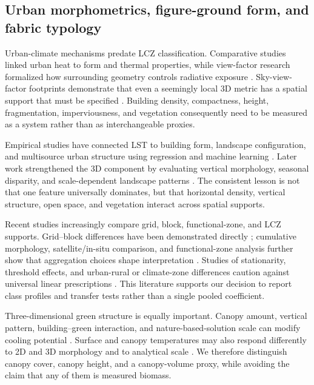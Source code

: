 \subsection{Urban morphometrics, figure-ground form, and fabric typology}

Urban-climate mechanisms predate LCZ classification. Comparative studies linked
urban heat to form and thermal properties, while view-factor research formalized
how surrounding geometry controls radiative exposure \citep{emmanuel2007UrbanHeat,
chen2010ViewFactor}. Sky-view-factor footprints demonstrate that even a
seemingly local 3D metric has a spatial support that must be specified
\citep{middel2018ViewFactor}. Building density, compactness, height,
fragmentation, imperviousness, and vegetation consequently need to be measured
as a system rather than as interchangeable proxies.

Empirical studies have connected LST to building form, landscape configuration,
and multisource urban structure using regression and machine learning
\citep{ferreira2019ExplorinRelation,huang2019InvestigEffects,
sun2019QuantifyEffects,zhang2019EvaluatiEffect}. Later work strengthened the
3D component by evaluating vertical morphology, seasonal disparity, and
scale-dependent landscape patterns \citep{alexander2021InfluencProporti,
yang2021AssessinEffects,chen2022SeasonalDisparat,
han2022UnderstaSeasonal,wu2022QuantifyInfluenc,wu2022ScaleEffect}. The
consistent lesson is not that one feature universally dominates, but that
horizontal density, vertical structure, open space, and vegetation interact
across spatial supports.

Recent studies increasingly compare grid, block, functional-zone, and LCZ
supports. Grid--block differences have been demonstrated directly
\citep{jeon2023ImpactsUrban}; cumulative morphology, satellite/in-situ
comparison, and functional-zone analysis further show that aggregation choices
shape interpretation \citep{park2023QuantifyCumulati,puche2023InsightsInto,
du2024DoesUrban,lin2024DoesUrban}. Studies of stationarity, threshold effects, and urban-rural
or climate-zone differences caution against universal linear prescriptions
\citep{yuan2024EffectsUrban,zhao2024MechanisStationa,
chen2025ImpactsThreshol,debray2025UniversaPatterns}. This literature supports
our decision to report class profiles and transfer tests rather than a
single pooled coefficient.

Three-dimensional green structure is equally important. Canopy amount,
vertical pattern, building--green interaction, and nature-based-solution scale
can modify cooling potential \citep{bai2025ImpactBuilding,
hu2025ComparinGreen,wei2025UrbanCooling}. Surface and canopy temperatures may
also respond differently to 2D and 3D morphology and to analytical scale
\citep{wu2025ContrastUrban,yu2026UrbanMorpholo}. We therefore distinguish
canopy cover, canopy height, and a canopy-volume proxy, while avoiding the claim
that any of them is measured biomass.

